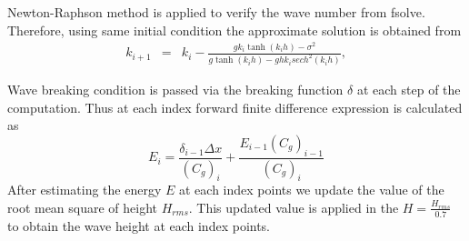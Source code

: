Newton-Raphson method is applied to verify the wave number from fsolve. Therefore, using same initial condition the approximate solution is obtained from
\begin{eqnarray}
k_{i+1}& =& k_{i}-\frac{gk_i\tanh(k_ih)-\sigma^2}{g\tanh(k_ih)-ghk_i sech^2(k_ih)},
\end{eqnarray}

Wave breaking condition is passed via the breaking function ${\delta}$ at each step of the computation.
Thus at each index forward finite difference expression is calculated as
$$E_{i}=\frac{\delta_{i-1}\Delta x}{(C_g)_{i}}+\frac{E_{i-1}(C_g)_{i-1}}{(C_g)_{i}}$$
 After estimating the energy ${E}$ at each index points we update the value of the root mean square of height ${H_{rms}}$. This updated value is applied in the ${H=\frac{H_{rms}}{0.7}}$ to obtain the wave height at each index points. 



